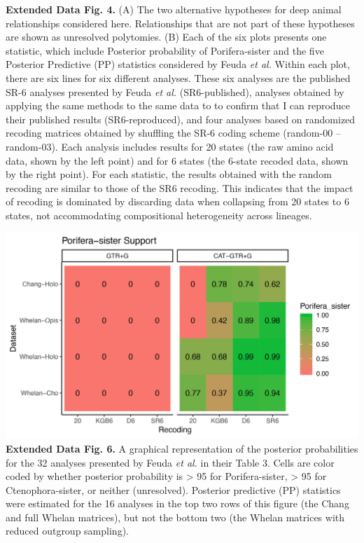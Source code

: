 \documentclass[]{article}
\begin{document}
\textbf{Extended Data Fig. 4.} (A) The two alternative hypotheses for
deep animal relationships considered here. Relationships that are not
part of these hypotheses are shown as unresolved polytomies. (B) Each of
the six plots presents one statistic, which include Posterior
probability of Porifera-sister and the five Posterior Predictive (PP)
statistics considered by Feuda \emph{et al.} Within each plot, there are
six lines for six different analyses. These six analyses are the
published SR-6 analyses presented by Feuda \emph{et al.}
(SR6-published), analyses obtained by applying the same methods to the
same data to to confirm that I can reproduce their published results
(SR6-reproduced), and four analyses based on randomized recoding
matrices obtained by shuffling the SR-6 coding scheme (random-00 --
random-03). Each analysis includes results for 20 states (the raw amino
acid data, shown by the left point) and for 6 states (the 6-state
recoded data, shown by the right point). For each statistic, the results
obtained with the random recoding are similar to those of the SR6
recoding. This indicates that the impact of recoding is dominated by
discarding data when collapsing from 20 states to 6 states, not
accommodating compositional heterogeneity across lineages.

\includegraphics{figures/Figure_recoding_summary.png} \textbf{Extended
Data Fig. 6.} A graphical representation of the posterior probabilities
for the 32 analyses presented by Feuda \emph{et al.} in their Table 3.
Cells are color coded by whether posterior probability is \textgreater{}
95 for Porifera-sister, \textgreater{} 95 for Ctenophora-sister, or
neither (unresolved). Posterior predictive (PP) statistics were
estimated for the 16 analyses in the top two rows of this figure (the
Chang and full Whelan matrices), but not the bottom two (the Whelan
matrices with reduced outgroup sampling).
\end{document}
